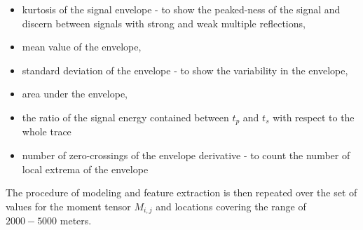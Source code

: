 \documentclass[letterpaper,11pt]{article}
\begin{document}
\begin{itemize}
 \item kurtosis of the signal envelope - to show the peaked-ness of the signal and discern between signals with strong and weak multiple reflections,
 \item mean value of the envelope,
 \item standard deviation of the envelope - to show the variability in the envelope,
 \item area under the envelope,
 \item the ratio of the signal energy contained between $t_{p}$ and $t_{s}$ with respect to the whole trace
 \item number of zero-crossings of the envelope derivative - to count the number of local extrema of the envelope
\end{itemize}
The procedure of modeling and feature extraction is then repeated over the set of values for the moment tensor $M_{i,j}$ and locations covering the range of $2000-5000$ meters.
\end{document}
